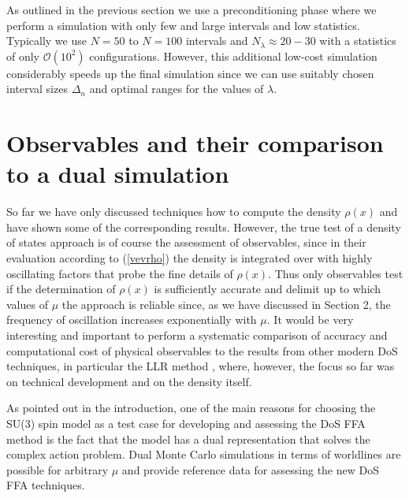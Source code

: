 \documentclass[a4paper,11pt]{article}
\begin{document}
As outlined in the previous section we use a preconditioning phase where we perform a simulation with only few and 
large intervals and low statistics. Typically we use $N =  50$ to $N = 100$ intervals and $N_{\lambda}\approx20-30$ 
with a statistics of only $\mathcal{O}(10^2)$ configurations. However, this additional low-cost simulation 
considerably speeds up the final simulation since we can use suitably chosen interval sizes $\Delta_n$
and optimal ranges for the values of $\lambda$.

\section{Observables and their comparison to a dual simulation}

So far we have only discussed techniques how to compute the density $\rho(x)$ and have 
shown some of the corresponding results.
However, the true test of a density of states approach is of course the assessment of observables, since in their 
evaluation according to  (\ref{vevrho}) the density is integrated over with highly oscillating factors that probe the fine
details of $\rho(x)$. Thus only observables test if the determination of $\rho(x)$ is sufficiently accurate and delimit 
up to which values of $\mu$ the approach is reliable since, as we have discussed in Section 2, the frequency of 
oscillation increases exponentially with $\mu$. It would be very interesting and important to perform a systematic 
comparison of accuracy and computational cost of physical observables 
to the results from other modern DoS techniques, in particular the LLR method 
\cite{Langfeld:2012ah,Langfeld:2013xbf,Langfeld:2014nta,Langfeld:2015fua,Garron:2016noc}, where, however, 
the focus so far was on technical development and on the density itself.

As pointed out in the introduction, one of the main reasons for choosing the SU(3) spin model as a test case for
developing and assessing the DoS FFA method is the fact that the model has a dual representation 
\cite{Gattringer:2011gq} that solves the complex action problem. Dual Monte Carlo simulations in terms of worldlines
\cite{Mercado:2012ue,Delgado:2012uh} are possible for arbitrary $\mu$ and provide reference data for assessing the 
new DoS FFA techniques.
\end{document}
